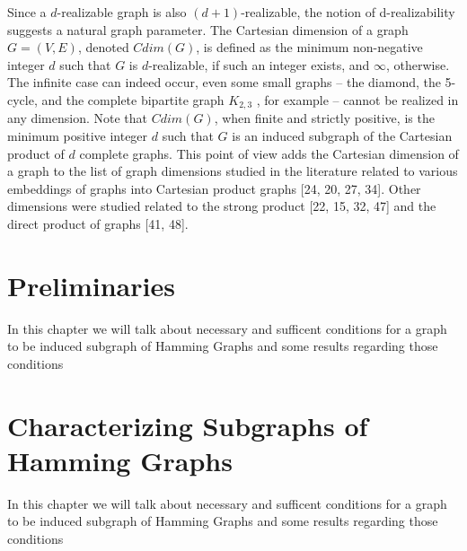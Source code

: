 \documentclass[12pt,a4paper,titlepage,openany]{report}
\begin{document}
Since a $d$-realizable graph is also $(d + 1)$-realizable, the notion of d-realizability suggests a natural graph parameter. The Cartesian dimension of a graph $G = (V, E)$, denoted $Cdim(G)$, is defined as the minimum non-negative integer $d$ such that $G$ is $d$-realizable, if such an integer exists, and $\infty$, otherwise. The infinite case can indeed occur, even some small graphs – the diamond, the 5-cycle, and the complete bipartite graph $K_{2,3}$ , for example – cannot be realized in any dimension. Note that $Cdim(G)$, when finite and strictly positive, is the minimum positive integer $d$ such that $G$ is an induced subgraph of the Cartesian product
of $d$ complete graphs. This point of view adds the Cartesian dimension of a graph to the list of graph dimensions studied in the literature related to various embeddings of graphs into Cartesian product graphs [24, 20, 27, 34]. Other dimensions were studied related to the
strong product [22, 15, 32, 47] and the direct product of graphs [41, 48].

\chapter{Preliminaries}
\thispagestyle{fancy}

In this chapter we will talk about necessary and sufficent conditions for a graph to be induced subgraph of Hamming Graphs and some results regarding those conditions 

\chapter{Characterizing Subgraphs of Hamming Graphs}
\thispagestyle{fancy}

In this chapter we will talk about necessary and sufficent conditions for a graph to be induced subgraph of Hamming Graphs and some results regarding those conditions 
\end{document}
